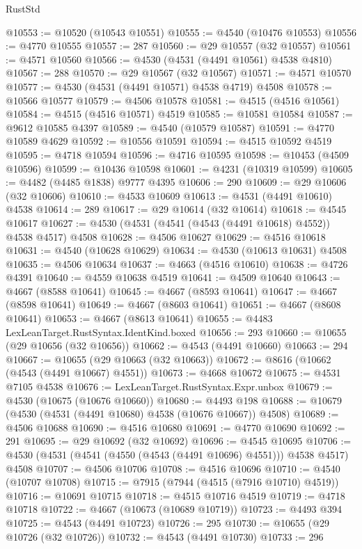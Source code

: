 \begin{lexlean}{RustStd}
\begin{coremodule}
{\begin{coremodule}
{{{{{{{{{{{{{{{{{{{{{{{{{{{{{{{{{{{{{{{{{{{{{{{{{{{{{{{@10553 := @10520 (@10543 @10551)
@10555 := @4540 (@10476 @10553)
@10556 := @4770 @10555
@10557 := 287
@10560 := @29 @10557 (@32 @10557)
@10561 := @4571 @10560
@10566 := @4530 (@4531 (@4491 @10561) @4538 @4810)
@10567 := 288
@10570 := @29 @10567 (@32 @10567)
@10571 := @4571 @10570
@10577 := @4530 (@4531 (@4491 @10571) @4538 @4719) @4508
@10578 := @10566 @10577
@10579 := @4506 @10578
@10581 := @4515 (@4516 @10561)
@10584 := @4515 (@4516 @10571) @4519
@10585 := @10581 @10584
@10587 := @9612 @10585 @4397
@10589 := @4540 (@10579 @10587)
@10591 := @4770 @10589 @4629
@10592 := @10556 @10591
@10594 := @4515 @10592 @4519
@10595 := @4718 @10594
@10596 := @4716 @10595
@10598 := @10453 (@4509 @10596)
@10599 := @10436 @10598
@10601 := @4231 (@10319 @10599)
@10605 := @4482 (@4485 @1838) @9777 @4395
@10606 := 290
@10609 := @29 @10606 (@32 @10606)
@10610 := @4533 @10609
@10613 := @4531 (@4491 @10610) @4538
@10614 := 289
@10617 := @29 @10614 (@32 @10614)
@10618 := @4545 @10617
@10627 := @4530 (@4531 (@4541 (@4543 (@4491 @10618) @4552)) @4538 @4517) @4508
@10628 := @4506 @10627
@10629 := @4516 @10618
@10631 := @4540 (@10628 @10629)
@10634 := @4530 (@10613 @10631) @4508
@10635 := @4506 @10634
@10637 := @4663 (@4516 @10610)
@10638 := @4726 @4391
@10640 := @4559 @10638 @4519
@10641 := @4509 @10640
@10643 := @4667 (@8588 @10641)
@10645 := @4667 (@8593 @10641)
@10647 := @4667 (@8598 @10641)
@10649 := @4667 (@8603 @10641)
@10651 := @4667 (@8608 @10641)
@10653 := @4667 (@8613 @10641)
@10655 := @4483 LexLeanTarget.RustSyntax.IdentKind.boxed
@10656 := 293
@10660 := @10655 (@29 @10656 (@32 @10656))
@10662 := @4543 (@4491 @10660)
@10663 := 294
@10667 := @10655 (@29 @10663 (@32 @10663))
@10672 := @8616 (@10662 (@4543 (@4491 @10667) @4551))
@10673 := @4668 @10672
@10675 := @4531 @7105 @4538
@10676 := LexLeanTarget.RustSyntax.Expr.unbox
@10679 := @4530 (@10675 (@10676 @10660))
@10680 := @4493 @198
@10688 := @10679 (@4530 (@4531 (@4491 @10680) @4538 (@10676 @10667)) @4508)
@10689 := @4506 @10688
@10690 := @4516 @10680
@10691 := @4770 @10690
@10692 := 291
@10695 := @29 @10692 (@32 @10692)
@10696 := @4545 @10695
@10706 := @4530 (@4531 (@4541 (@4550 (@4543 (@4491 @10696) @4551))) @4538 @4517) @4508
@10707 := @4506 @10706
@10708 := @4516 @10696
@10710 := @4540 (@10707 @10708)
@10715 := @7915 (@7944 (@4515 (@7916 @10710) @4519))
@10716 := @10691 @10715
@10718 := @4515 @10716 @4519
@10719 := @4718 @10718
@10722 := @4667 (@10673 (@10689 @10719))
@10723 := @4493 @394
@10725 := @4543 (@4491 @10723)
@10726 := 295
@10730 := @10655 (@29 @10726 (@32 @10726))
@10732 := @4543 (@4491 @10730)
@10733 := 296
}}}}}}}}}}}}}}}}}}}}}}}}}}}}}}}}}}}}}}}}}}}}}}}}}}}}}}}
\end{coremodule}}
\end{coremodule}
\end{lexlean}
